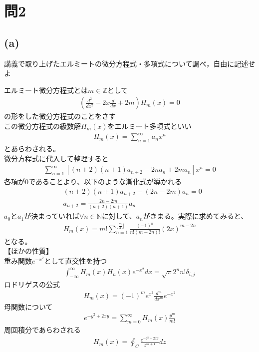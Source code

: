 \documentclass[pdflatex,ja=standard,fleqn]{bxjsarticle}
\begin{document}
\section*{問2}
\subsection*{(a)}
\begin{screen}
    講義で取り上げたエルミートの微分方程式・多項式について調べ，自由に記述せよ
\end{screen}
エルミート微分方程式とは$m\in\mathbb{Z}$として
\begin{eqnarray*}
    (\frac{d^2}{dx^2}-2x\frac{d}{dx}+2m)H_{m}(x)=0
\end{eqnarray*}
の形をした微分方程式のことをさす\\
この微分方程式の級数解$H_{m}(x)$をエルミート多項式といい
\begin{eqnarray*}
    H_{m}(x)=\sum_{n=1}^{\infty} a_{n}x^{n}
\end{eqnarray*}
とあらわされる。\\
微分方程式に代入して整理すると
\begin{eqnarray*}
    \sum_{n=1}^{\infty} [(n+2)(n+1)a_{n+2}-2na_{n}+2ma_{n}] x^{n}=0
\end{eqnarray*}
各項が$0$であることより、以下のような漸化式が導かれる
\begin{align*}
    &(n+2)(n+1)a_{n+2}-(2n-2m)a_{n}=0\\
    &a_{n+2}=\frac{2n-2m}{(n+2)(n+1)}a_{n}
\end{align*}
$a_{0}$と$a_{1}$が決まっていれば$\forall n\in\mathbb{N}$に対して、$a_{n}$がきまる。実際に求めてみると、
\begin{eqnarray*}
    H_{m}(x)=m!\sum_{n=1}^{\lfloor\frac{m}{2}\rfloor} \frac{(-1)^n}{n!(m-2n)!}(2x)^{m-2n}
\end{eqnarray*}
となる。\\
【ほかの性質】\\
重み関数$e^{-x^2}$として直交性を持つ
\begin{eqnarray*}
    \int_{-\infty}^{\infty} H_{m}(x)H_{n}(x)e^{-x^2}dx=\sqrt{\pi}2^{n}n!\delta_{i,j}
\end{eqnarray*}
ロドリゲスの公式
\begin{eqnarray*}
    H_{m}(x)=(-1)^{m}e^{x^2}\frac{d^m}{dx^m}e^{-x^2}
\end{eqnarray*}
母関数について
\begin{eqnarray*}
    e^{-y^2+2xy}=\sum_{m=0}^{\infty}H_{m}(x)\frac{y^m}{m!}
\end{eqnarray*}
周回積分であらわされる
\begin{eqnarray*}
    H_{m}(x)=\oint_C \frac{e^{-z^2+2xz}}{z^{m+1}}dz
\end{eqnarray*}
\end{document}
